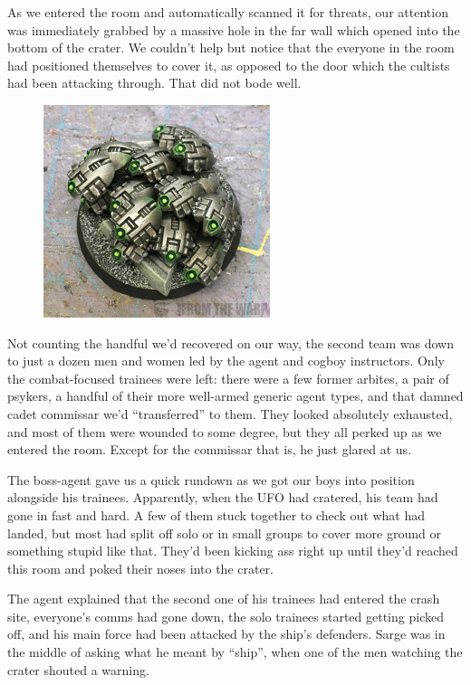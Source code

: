 As we entered the room and automatically scanned it for threats, our attention was immediately grabbed by a massive hole in the far wall which opened into the bottom of the crater. 
We couldn’t help but notice that the everyone in the room had positioned themselves to cover it, as opposed to the door which the cultists had been attacking through. 
That did not bode well.

\begin{figure}
	\begin{center}
		\includegraphics[width=\figwidth]{pics/8/41.png}
	\end{center}
\end{figure}
Not counting the handful we’d recovered on our way, the second team was down to just a dozen men and women led by the agent and cogboy instructors. 
Only the combat-focused trainees were left: 
there were a few former arbites, a pair of psykers, a handful of their more well-armed generic agent types, and that damned cadet commissar we’d “transferred” to them. 
They looked absolutely exhausted, and most of them were wounded to some degree, but they all perked up as we entered the room. 
Except for the commissar that is, he just glared at us.

The boss-agent gave us a quick rundown as we got our boys into position alongside his trainees. 
Apparently, when the UFO had cratered, his team had gone in fast and hard. 
A few of them stuck together to check out what had landed, but most had split off solo or in small groups to cover more ground or something stupid like that. 
They’d been kicking ass right up until they’d reached this room and poked their noses into the crater. 


The agent explained that the second one of his trainees had entered the crash site, everyone’s comms had gone down, the solo trainees started getting picked off, and his main force had been attacked by the ship’s defenders. 
Sarge was in the middle of asking what he meant by “ship”, when one of the men watching the crater shouted a warning.

